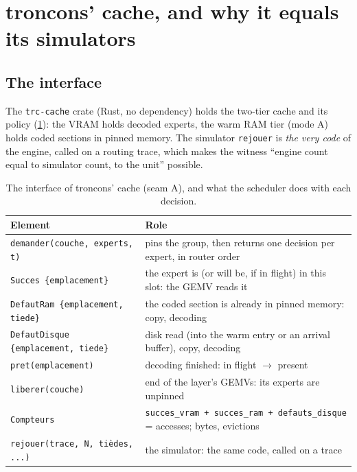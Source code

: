 \section{troncons' cache, and why it equals its simulators}\label{sec:t2o-trc-cache}

\subsection{The interface}

The \texttt{trc-cache} crate (Rust, no dependency) holds the two-tier cache and its policy (\cref{tab:t2o-interface}): the VRAM holds decoded experts, the warm RAM tier (mode A) holds coded sections in pinned memory. The simulator \texttt{rejouer} is \emph{the very code} of the engine, called on a routing trace, which makes the witness \enquote{engine count equal to simulator count, to the unit} possible.

\begin{table}[ht]
\centering\small
\caption[The interface of the cache]{The interface of troncons' cache (seam A), and what the scheduler does with each decision.}
\label{tab:t2o-interface}
\begin{tabularx}{\linewidth}{@{}lX@{}}
\toprule
Element & Role \\
\midrule
\texttt{demander(couche, experts, t)} & pins the group, then returns one decision per expert, in router order \\
\texttt{Succes \{emplacement\}} & the expert is (or will be, if in flight) in this slot: the GEMV reads it \\
\texttt{DefautRam \{emplacement, tiede\}} & the coded section is already in pinned memory: copy, decoding \\
\texttt{DefautDisque \{emplacement, tiede\}} & disk read (into the warm entry or an arrival buffer), copy, decoding \\
\texttt{pret(emplacement)} & decoding finished: in flight $\to$ present \\
\texttt{liberer(couche)} & end of the layer's GEMVs: its experts are unpinned \\
\texttt{Compteurs} & \texttt{succes\_vram + succes\_ram + defauts\_disque} = accesses; bytes, evictions \\
\texttt{rejouer(trace, N, tièdes, ...)} & the simulator: the same code, called on a trace \\
\bottomrule
\end{tabularx}
\end{table}

